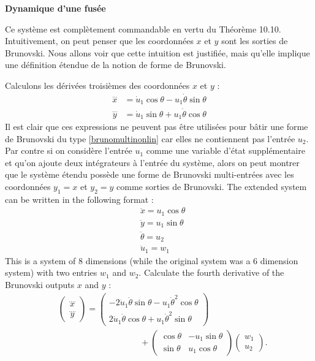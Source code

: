 \begin{theoreme}
\begin{exemple}{\bf Dynamique d'une fusée}
\end{exemple}
Ce système est complètement commandable en vertu du Théorème 10.10. Intuitivement, on peut penser que les coordonnées $x$ et $y$ sont les sorties de Brunovski. Nous allons voir que cette intuition est justifiée, mais qu'elle implique une définition étendue de la notion de forme de Brunovski.

Calculons les dérivées troisièmes des coordonnées $x$ et $y$ :
\begin{align*}
\stackrel{\dots}{x} &= \dot u_1 \cos \theta - u_1 \dot \theta \sin \theta \\
\stackrel{\dots}{y} &= \dot u_1 \sin \theta + u_1 \dot \theta \cos \theta
\end{align*}
Il est clair que ces expressions ne peuvent pas être utilisées pour bâtir une forme de Brunovski du type \eqref{brunomultinonlin} car elles ne contiennent pas l'entrée $u_2$. Par contre si on considère l'entrée $u_1$ comme une variable d'état supplémentaire et qu'on ajoute deux intégrateurs à l'entrée du système, alors on peut montrer que le système étendu possède une forme de Brunovski multi-entrées avec les coordonnées $y_1 = x$ et $y_2 = y$ comme sorties de Brunovski. The extended system can be written in the following format :
\begin{align} \label{etendufusee}
&\ddot x = u_1 \cos \theta \nonumber \\
&\ddot y = u_1 \sin \theta \nonumber \\
&\ddot \theta = u_2 \\
&\ddot u_1 = w_1 \nonumber
\end{align}
This is a system of 8 dimensions (while the original system was a 6 dimension system) with two entries $w_1$ and $w_2$. Calculate the fourth derivative of the Brunovski outputs $x$ and $y$ : 
\begin{align}
&\left(\begin{array}{c}\stackrel{....}{x} \\ \stackrel{....}{y} \end{array}\right) = \left(\begin{array}{c}-2\dot u_1 \dot \theta \sin \theta - u_1 \dot \theta^2 \cos \theta 
 \\ 2\dot u_1 \dot \theta \cos \theta + u_1 \dot \theta^2 \sin \theta\end{array}\right) \nonumber \\
&\hspace{4cm} + \left(\begin{array}{cc}\cos \theta & -u_1 \sin \theta \\\sin \theta & u_1 \cos \theta\end{array}\right)\left(\begin{array}{c}w_1 \\u_2\end{array}\right). \label{brunofusee}

\end{align}
\end{theoreme}
